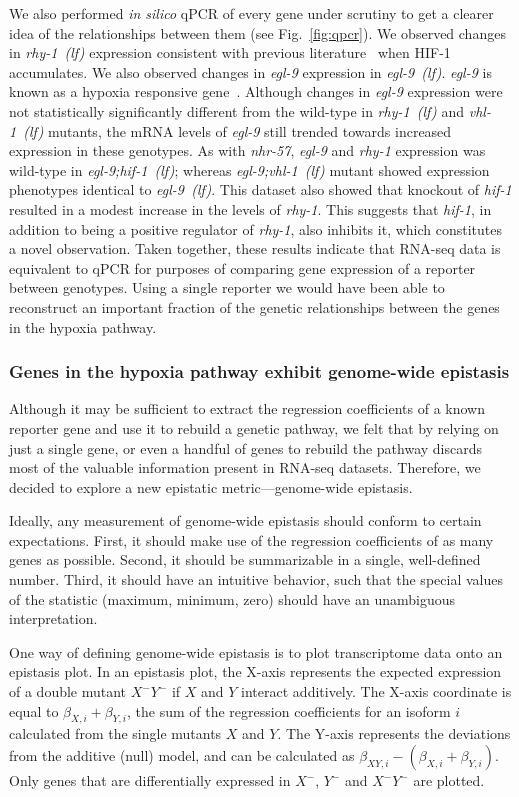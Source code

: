 \documentclass[9pt,twocolumn,twoside]{pnas-new}
\newcommand{\gene}[1]{\emph{#1}}
\newcommand{\nhr}{\emph{nhr-57}}
\newcommand{\egl}{\emph{egl-9~(lf)}}
\newcommand{\rhy}{\emph{rhy-1~(lf)}}
\newcommand{\vhl}{\emph{vhl-1~(lf)}}
\newcommand{\eglvhl}{\emph{egl-9;vhl-1~(lf)}}
\newcommand{\eglhif}{\emph{egl-9;hif-1~(lf)}}
\newcommand{\hifp}{HIF-1}
\begin{document}
We also performed \emph{in silico} qPCR of every gene under scrutiny to get a
clearer idea of the relationships between them (see Fig.~\ref{fig:qpcr}). We
observed changes in \rhy{} expression consistent with previous
literature~\cite{Shen2006} when \hifp{} accumulates.
We also observed changes in \gene{egl-9} expression in \egl{}.
\gene{egl-9} is known as a hypoxia responsive gene~\cite{Powell-Coffman2010}.
Although changes in \gene{egl-9} expression were not statistically significantly
different from the wild-type in
\rhy{} and \vhl{} mutants, the mRNA levels of \gene{egl-9} still trended towards
increased expression in these genotypes. As with \nhr{}, \gene{egl-9} and
\gene{rhy-1} expression was wild-type in \eglhif{}; whereas \eglvhl{}
mutant showed expression phenotypes identical to \egl{}. This dataset also showed
that knockout of \gene{hif-1} resulted in a modest increase in
the levels of \gene{rhy-1}. This suggests that \gene{hif-1}, in addition to being
a positive regulator of \gene{rhy-1}, also inhibits it, which constitutes a novel
observation. Taken together, these results indicate that RNA-seq data is
equivalent to qPCR for purposes of comparing gene expression of a reporter between
genotypes. Using a single reporter we would have been able to reconstruct an
important fraction of the genetic relationships between the genes in the hypoxia
pathway.

\subsubsection*{Genes in the hypoxia pathway exhibit genome-wide epistasis}
Although it may be sufficient to extract the regression coefficients of a
known reporter gene and use it to rebuild a genetic pathway, we felt that by
relying on just a single gene, or even a handful of genes to rebuild the pathway
discards most of the valuable information present in RNA-seq datasets. Therefore,
we decided to explore a new epistatic metric---genome-wide epistasis.

Ideally, any measurement of genome-wide epistasis should conform to certain
expectations. First, it should make use of the regression coefficients of as
many genes as possible. Second, it should be summarizable in a single,
well-defined number. Third, it should have an intuitive behavior, such that
the special values of the statistic (maximum, minimum, zero) should have an
unambiguous interpretation.

One way of defining genome-wide epistasis is to plot transcriptome data onto
an epistasis plot. In an epistasis plot, the X-axis represents the
expected expression of a double mutant $X^-Y^-$ if $X$ and $Y$ interact additively.
The X-axis coordinate is equal to $\beta_{X,i} + \beta_{Y,i}$, the sum of
the regression coefficients for an isoform $i$ calculated from the single mutants $X$
and $Y$. The Y-axis represents the deviations from the additive (null) model, and
can be calculated as $\beta_{XY, i} - (\beta_{X,i} + \beta_{Y,i})$. Only
genes that are differentially expressed in $X^-$, $Y^-$ and $X^-Y^-$ are plotted.
\end{document}
